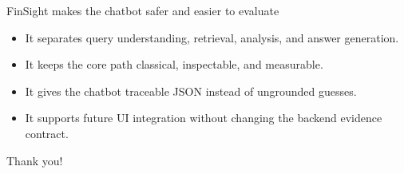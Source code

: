 \documentclass[10pt]{beamer}
\begin{document}
\begin{frame}{FinSight makes the chatbot safer and easier to evaluate}
  \begin{itemize}
    \item It separates query understanding, retrieval, analysis, and answer generation.
    \item It keeps the core path classical, inspectable, and measurable.
    \item It gives the chatbot traceable JSON instead of ungrounded guesses.
    \item It supports future UI integration without changing the backend evidence contract.
  \end{itemize}
  \vspace{1em}
  \textcolor{myNewColorA}{\Huge{\centerline{Thank you!}}}
\end{frame}
\end{document}
